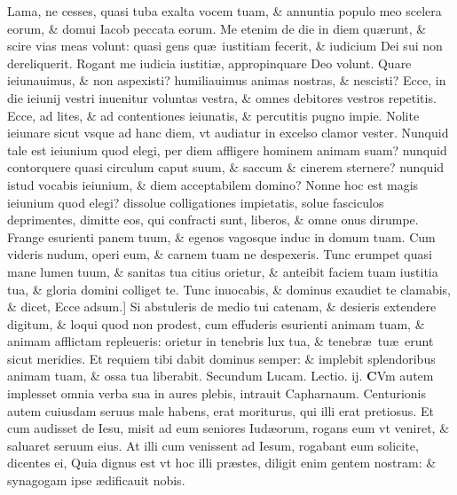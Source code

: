\documentclass[a5paper,10pt]{book}
\def\leftmarginnote{%
	\lrmarginnote{\hskip -\marginparsep \hskip -6.5em}}
\def\rightmarginnote{%
	\lrmarginnote{\hskip\columnwidth \hskip -1em}}
\def\ae{æ}
\begin{document}
\begin{multicols*}{2}
\vspace{-.25em}
\textdagger Lama,\rightmarginnote{c. 58.\\a} ne cesses, quasi tuba exalta vocem tuam, \& annuntia populo meo scelera eorum, \& domui Iacob peccata eorum.
Me etenim de die in diem qu\ae runt, \& scire vias meas volunt: quasi gens qu\ae \ iustitiam fecerit, \& iudicium Dei sui non dereliquerit.
Rogant me iudicia iustiti\ae , appropinquare Deo volunt.
Quare ieiunauimus, \& non aspexisti? humiliauimus animas nostras, \& nescisti?
Ecce, in die ieiunij vestri inuenitur voluntas vestra, \& omnes debitores vestros repetitis.
Ecce, ad lites, \& ad contentiones ieiunatis, \& percutitis pugno impie.
Nolite ieiunare sicut vsque ad hanc diem, vt audiatur in excelso clamor vester.
Nunquid tale est ieiunium quod elegi, per diem affligere hominem animam suam? nunquid contorquere quasi circulum caput suum, \& saccum \& cinerem sternere? nunquid istud vocabis ieiunium, \& diem acceptabilem domino?
Nonne hoc est magis ieiunium quod elegi? dissolue
colligationes impietatis, solue fasciculos deprimentes, dimitte eos, qui confracti sunt, liberos, \& omne onus dirumpe.
Frange esurienti panem tuum, \& egenos vagosque induc in domum tuam.
Cum videris nudum, operi eum, \& carnem tuam ne despexeris.
Tunc erumpet quasi mane lumen tuum, \& sanitas tua citius orietur, \& anteibit faciem tuam iustitia tua, \& gloria domini colliget te.
Tunc inuocabis, \& dominus exaudiet te clamabis, \& dicet, Ecce adsum.]
Si\rightmarginnote{B} abstuleris de medio tui catenam, \& desieris extendere digitum, \& loqui quod non prodest, cum effuderis esurienti animam tuam, \& animam afflictam repleueris: orietur in tenebris lux tua, \& tenebr\ae \ tu\ae \ erunt sicut meridies.
Et requiem tibi dabit dominus semper: \& implebit splendoribus animam tuam, \& ossa tua liberabit.
\newline \color{red} Secundum Lucam. \hfill Lectio. ij. \color{black}
\vspace{-.25em}
\lettrine[lines=2]{\bfseries \color{red} C}{}Vm\leftmarginnote{\begin{flushright}ca. 7.\end{flushright}} autem implesset omnia verba sua in aures plebis, intrauit Capharnaum.
Centurionis autem cuiusdam seruus male habens, erat moriturus, qui illi erat pretiosus.
Et cum audisset de Iesu, misit ad eum seniores Iud\ae orum, rogans eum vt veniret, \& saluaret seruum eius.
At illi cum venissent ad Iesum, rogabant eum solicite, dicentes ei, Quia dignus est vt hoc illi pr\ae stes, diligit enim gentem nostram: \& synagogam ipse \ae dificauit nobis.

\end{multicols*}
\end{document}
